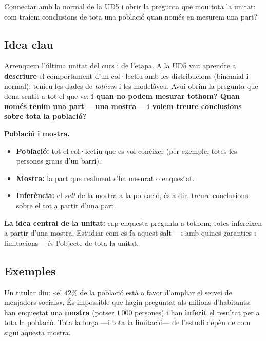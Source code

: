 %
{Connectar amb la normal de la UD5 i obrir la pregunta que mou tota la unitat: com traiem conclusions de tota una població quan només en mesurem una part?}

\subsection{Idea clau}

Arrenquem l'última unitat del curs i de l'etapa. A la UD5 vau aprendre a \textbf{descriure}
el comportament d'un col·lectiu amb les distribucions (binomial i normal): teníeu les
dades de \emph{tothom} i les modelàveu. Avui obrim la pregunta que dona sentit a tot el
que ve: \textbf{i quan no podem mesurar tothom? Quan només tenim una part —una mostra— i
volem treure conclusions sobre tota la població?}

\begin{idea}
\textbf{Població i mostra.}
\begin{itemize}[leftmargin=1.4em, itemsep=2pt]
  \item \textbf{Població:} tot el col·lectiu que es vol conèixer (per exemple, totes les
        persones grans d'un barri).
  \item \textbf{Mostra:} la part que realment s'ha mesurat o enquestat.
  \item \textbf{Inferència:} el \emph{salt} de la mostra a la població, és a dir, treure
        conclusions sobre el tot a partir d'una part.
\end{itemize}
\textbf{La idea central de la unitat:} cap enquesta pregunta a tothom; totes infereixen a
partir d'una mostra. Estudiar com es fa aquest salt —i amb quines garanties i
limitacions— és l'objecte de tota la unitat.
\end{idea}

\subsection{Exemples}

\begin{exemple}
Un titular diu: «el $42\%$ de la població està a favor d'ampliar el servei de menjadors
socials». És impossible que hagin preguntat als milions d'habitants: han enquestat una
\textbf{mostra} (potser $1\,000$ persones) i han \textbf{inferit} el resultat per a tota
la població. Tota la força —i tota la limitació— de l'estudi depèn de com sigui aquesta
mostra.
\end{exemple}


